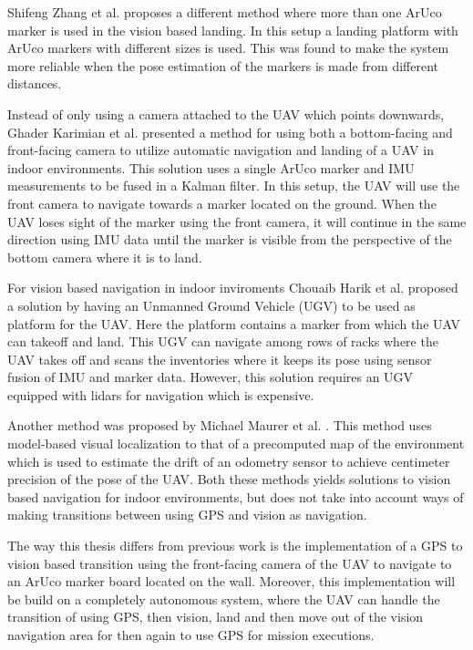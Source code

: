 \documentclass[../Head/report.tex]{subfiles}
\begin{document}
Shifeng Zhang et al. \cite{AnOnboardVisionBasedSystemNovelLandingPad} 	proposes a different method where more than one ArUco marker is used in the vision based landing. In this setup a landing platform with ArUco markers with different sizes is used. This was found to make the system more reliable when the pose estimation of the markers is made from different distances.   

Instead of only using a camera attached to the UAV which points downwards, Ghader Karimian et al. \cite{AutomaticnavigationandlandingofanindoorAR} presented a method for using both a bottom-facing and front-facing camera to utilize automatic navigation and landing of a UAV in indoor environments.  This solution uses a single ArUco marker and IMU measurements to be fused in a Kalman filter. In this setup, the UAV will use the front camera to navigate towards a marker located on the ground. When the UAV loses sight of the marker using the front camera, it will continue in the same direction using IMU data until the marker is visible from the perspective of the bottom camera where it is to land.

For vision based navigation in indoor inviroments Chouaib Harik et al. \cite{TowardsAnAutonomousVisionBasedInventoryDroneOne} proposed a solution by having an Unmanned Ground Vehicle (UGV) to be used as platform for the UAV. Here the platform contains a marker from which the UAV can takeoff and land. This UGV can navigate among rows of racks where the UAV takes off and scans the inventories where it keeps its pose using sensor fusion of IMU and marker data. However, this solution requires an UGV equipped with lidars for navigation which is expensive. 

Another method was proposed by Michael Maurer et al. \cite{TowardsAnAutonomousVisionBasedInventoryDroneTwo}. This method uses model-based visual localization to that of a precomputed
map of the environment which is used to estimate the drift of an odometry sensor to achieve centimeter precision of the pose of the UAV. Both these methods yields solutions to vision based navigation for indoor environments, but does not take into account ways of making transitions between using GPS and vision as navigation.

The way this thesis differs from previous work is the implementation of a GPS to vision based transition using the front-facing camera of the UAV to navigate to an ArUco marker board located on the wall. Moreover, this implementation will be build on a completely autonomous system, where the UAV can handle the transition of using GPS, then vision, land and then move out of the vision navigation area for then again to use GPS for mission executions.
  
\end{document}
